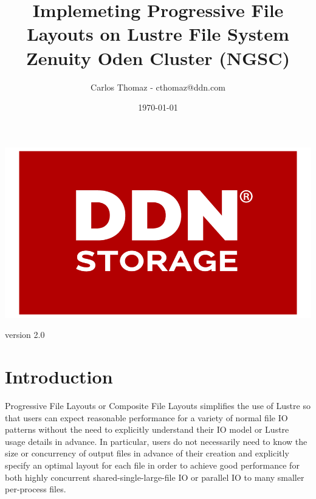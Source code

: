 \documentclass{article}
\title{%
Implemeting Progressive File Layouts on Lustre File System \\
\large Zenuity Oden Cluster (NGSC)}
\author{Carlos Thomaz - cthomaz@ddn.com}
\date{\today}
\begin{document}
\maketitle


\begin{center}
    \includegraphics[scale=0.14]{logo.png}\\[1cm] 
\end{center}

\begin{center}
version 2.0
\end{center}

\newpage

\begin{versionhistory}
\end{versionhistory}
\newpage

\tableofcontents

\newpage
\section{Introduction}
Progressive File Layouts or Composite File Layouts simplifies the use of Lustre so that users can expect reasonable performance for a variety of normal file IO patterns without the need to explicitly understand their IO model or Lustre usage details in advance. In particular, users do not necessarily need to know the size or concurrency of output files in advance of their creation and explicitly specify an optimal layout for each file in order to achieve good performance for both highly concurrent shared-single-large-file IO or parallel IO to many smaller per-process files. 
\end{document}
